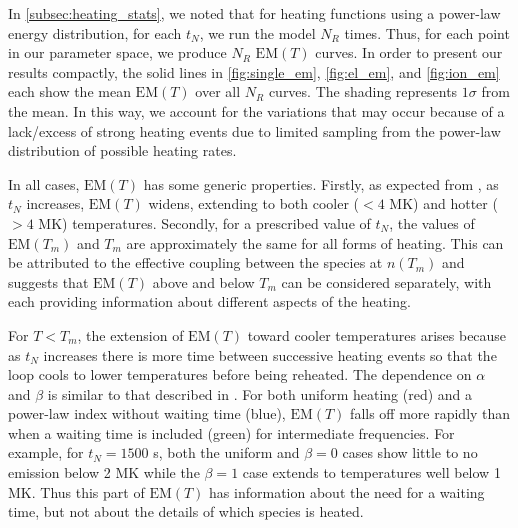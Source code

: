 \documentclass[preprint,linenumbers]{aastex}
\begin{document}
	\par In \autoref{subsec:heating_stats}, we noted that for heating functions using a power-law energy distribution, for each $t_N$, we run the model $N_R$ times. Thus, for each point in our parameter space, we produce $N_R$ $\mathrm{EM}(T)$ curves. In order to present our results compactly, the solid lines in \autoref{fig:single_em}, \autoref{fig:el_em}, and \autoref{fig:ion_em} each show the mean $\mathrm{EM}(T)$ over all $N_R$ curves. The shading represents $1\sigma$ from the mean. In this way, we account for the variations that may occur because of a lack/excess of strong heating events due to limited sampling from the power-law distribution of possible heating rates.
	\par In all cases, $\mathrm{EM}(T)$ has some generic properties. Firstly, as expected from \citet{cargill_active_2014}, as $t_N$ increases, $\mathrm{EM}(T)$ widens, extending to both cooler ($<4$ MK) and hotter ($>4$ MK) temperatures. Secondly, for a prescribed value of $t_N$, the values of $\mathrm{EM}(T_m)$ and $T_m$ are approximately the same for all forms of heating. This can be attributed to the effective coupling between the species at $n(T_m)$ and suggests that $\mathrm{EM}(T)$ above and below $T_m$ can be considered separately, with each providing information about different aspects of the heating.
	\par For $T<T_m$, the extension of $\mathrm{EM}(T)$ toward cooler temperatures arises because as $t_N$ increases there is more time between successive heating events so that the loop cools to lower temperatures before being reheated. The dependence on $\alpha$ and $\beta$ is similar to that described in \citet{cargill_active_2014}. For both uniform heating (red) and a power-law index without waiting time (blue), $\mathrm{EM}(T)$ falls off more rapidly than when a waiting time is included (green) for intermediate frequencies. For example, for $t_N=1500$ s, both the uniform and $\beta=0$ cases show little to no emission below 2 MK while the $\beta=1$ case extends to temperatures well below 1 MK. Thus this part of $\mathrm{EM}(T)$ has information about the need for a waiting time, but not about the details of which species is heated. 
\end{document}
